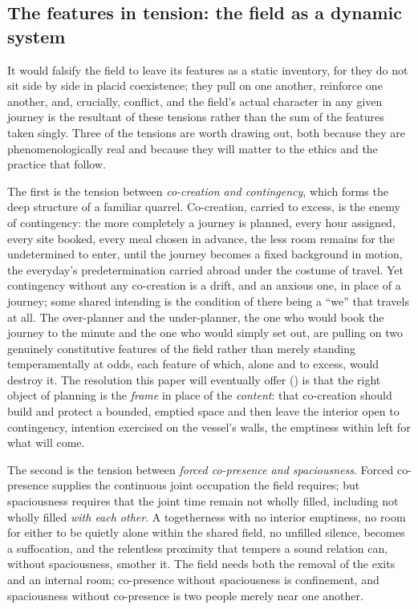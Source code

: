 \subsection{The features in tension: the field as a dynamic system}
\label{p21:sub:field-tensions}

It would falsify the field to leave its features as a static inventory, for they do not sit side by side in placid coexistence; they pull on one another, reinforce one another, and, crucially, conflict, and the field's actual character in any given journey is the resultant of these tensions rather than the sum of the features taken singly. Three of the tensions are worth drawing out, both because they are phenomenologically real and because they will matter to the ethics and the practice that follow.

The first is the tension between \emph{co-creation and contingency}, which forms the deep structure of a familiar quarrel. Co-creation, carried to excess, is the enemy of contingency: the more completely a journey is planned, every hour assigned, every site booked, every meal chosen in advance, the less room remains for the undetermined to enter, until the journey becomes a fixed background in motion, the everyday's predetermination carried abroad under the costume of travel. Yet contingency without any co-creation is a drift, and an anxious one, in place of a journey; some shared intending is the condition of there being a ``we'' that travels at all. The over-planner and the under-planner, the one who would book the journey to the minute and the one who would simply set out, are pulling on two genuinely constitutive features of the field rather than merely standing temperamentally at odds, each feature of which, alone and to excess, would destroy it. The resolution this paper will eventually offer () is that the right object of planning is the \emph{frame} in place of the \emph{content}: that co-creation should build and protect a bounded, emptied space and then leave the interior open to contingency, intention exercised on the vessel's walls, the emptiness within left for what will come.

The second is the tension between \emph{forced co-presence and spaciousness}. Forced co-presence supplies the continuous joint occupation the field requires; but spaciousness requires that the joint time remain not wholly filled, including not wholly filled \emph{with each other}. A togetherness with no interior emptiness, no room for either to be quietly alone within the shared field, no unfilled silence, becomes a suffocation, and the relentless proximity that tempers a sound relation can, without spaciousness, smother it. The field needs both the removal of the exits and an internal room; co-presence without spaciousness is confinement, and spaciousness without co-presence is two people merely near one another.


